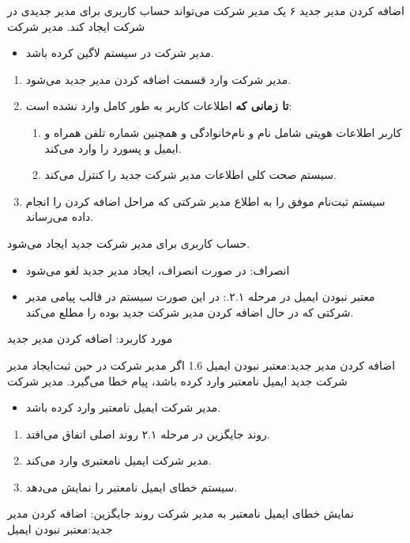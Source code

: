 \usecase
{اضافه کردن مدیر جدید}
{۶}
{یک مدیر شرکت می‌تواند حساب کاربری برای مدیر جدیدی در شرکت ایجاد کند.}
{مدیر شرکت}
{}
{
	\begin{itemize}
		\item
		مدیر شرکت در سیستم لاگین کرده باشد.
		
	\end{itemize}
}
{
\begin{enumerate}
	\item 
	مدیر شرکت وارد قسمت اضافه کردن مدیر جدید می‌شود.
	
\item
\textbf{تا زمانی که} اطلاعات کاربر به طور کامل وارد نشده است:

\begin{enumerate}[label=\theenumi.\arabic*.]
	\item
	کاربر اطلاعات هویتی شامل نام و نام‌خانوادگی و همچنین شماره تلفن همراه و ایمیل و پسورد را وارد می‌کند.

	
	\item 
	سیستم صحت کلی اطلاعات مدیر شرکت جدید را کنترل می‌کند.
\end{enumerate}

	\item 
سیستم ثبت‌نام موفق را به اطلاع مدیر شرکتی که مراحل اضافه کردن را انجام داده می‌رساند.

\end{enumerate}
}
{
حساب کاربری برای مدیر شرکت جدید ایجاد می‌شود.
}
{\begin{itemize}
		\vspace*{-0.6cm}
		\item انصراف: در صورت انصراف، ایجاد مدیر جدید لغو می‌شود
		\item معتبر نبودن ایمیل در مرحله ۲.۱.: در این صورت سیستم در قالب پیامی مدیر شرکتی که در حال اضافه کردن مدیر شرکت جدید بوده را مطلع می‌کند.
		
		
\end{itemize}}
{مورد کاربرد: اضافه کردن مدیر جدید}



\alternativeflow
{
	اضافه کردن مدیر جدید:معتبر نبودن ایمیل
}
{1.6}
{
	اگر مدیر شرکت در حین ثبت‌ایجاد مدیر شرکت جدید ایمیل نامعتبر وارد کرده باشد، پیام خطا می‌گیرد.
}
{
	مدیر شرکت
}
{}
{
	\begin{itemize}
		
		\item
		مدیر شرکت ایمیل نامعتبر وارد کرده باشد.
	\end{itemize}
}
{
	\vspace*{-0.6cm}
	\begin{enumerate}
		\item 
		روند جایگزین در مرحله ۲.۱ روند اصلی اتفاق می‌افتد.
		\item
		مدیر شرکت ایمیل نامعتبری وارد می‌کند.
		\item 
		سیستم خطای ایمیل نامعتبر را نمایش می‌دهد.
	\end{enumerate}
}
{
	نمایش خطای ایمیل نامعتبر به مدیر شرکت
}
{
	روند جایگزین: 	اضافه کردن مدیر جدید:معتبر نبودن ایمیل
}


